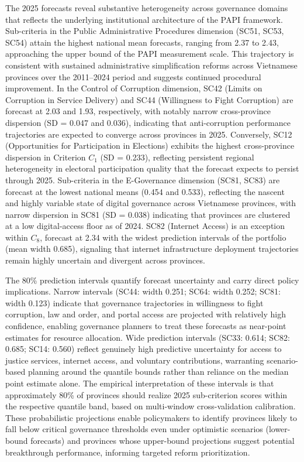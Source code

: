 \documentclass[12pt,a4paper]{article}
\begin{document}
The 2025 forecasts reveal substantive heterogeneity across governance domains that reflects the underlying institutional architecture of the PAPI framework. Sub-criteria in the Public Administrative Procedures dimension (SC51, SC53, SC54) attain the highest national mean forecasts, ranging from 2.37 to 2.43, approaching the upper bound of the PAPI measurement scale. This trajectory is consistent with sustained administrative simplification reforms across Vietnamese provinces over the 2011--2024 period and suggests continued procedural improvement. In the Control of Corruption dimension, SC42 (Limits on Corruption in Service Delivery) and SC44 (Willingness to Fight Corruption) are forecast at 2.03 and 1.93, respectively, with notably narrow cross-province dispersion (SD = 0.047 and 0.036), indicating that anti-corruption performance trajectories are expected to converge across provinces in 2025. Conversely, SC12 (Opportunities for Participation in Elections) exhibits the highest cross-province dispersion in Criterion $C_1$ (SD = 0.233), reflecting persistent regional heterogeneity in electoral participation quality that the forecast expects to persist through 2025. Sub-criteria in the E-Governance dimension (SC81, SC83) are forecast at the lowest national means (0.454 and 0.533), reflecting the nascent and highly variable state of digital governance across Vietnamese provinces, with narrow dispersion in SC81 (SD = 0.038) indicating that provinces are clustered at a low digital-access floor as of 2024. SC82 (Internet Access) is an exception within $C_8$, forecast at 2.34 with the widest prediction intervals of the portfolio (mean width 0.685), signaling that internet infrastructure deployment trajectories remain highly uncertain and divergent across provinces.

The 80\% prediction intervals quantify forecast uncertainty and carry direct policy implications. Narrow intervals (SC44: width 0.251; SC64: width 0.252; SC81: width 0.123) indicate that governance trajectories in willingness to fight corruption, law and order, and portal access are projected with relatively high confidence, enabling governance planners to treat these forecasts as near-point estimates for resource allocation. Wide prediction intervals (SC33: 0.614; SC82: 0.685; SC14: 0.560) reflect genuinely high predictive uncertainty for access to justice services, internet access, and voluntary contributions, warranting scenario-based planning around the quantile bounds rather than reliance on the median point estimate alone. The empirical interpretation of these intervals is that approximately 80\% of provinces should realize 2025 sub-criterion scores within the respective quantile band, based on multi-window cross-validation calibration. These probabilistic projections enable policymakers to identify provinces likely to fall below critical governance thresholds even under optimistic scenarios (lower-bound forecasts) and provinces whose upper-bound projections suggest potential breakthrough performance, informing targeted reform prioritization.
\end{document}

